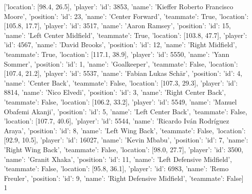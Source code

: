 [{'location': [98.4, 26.5], 'player': {'id': 3853, 'name': 'Kieffer Roberto Francisco Moore'}, 'position': {'id': 23, 'name': 'Center Forward'}, 'teammate': True}, {'location': [105.8, 17.7], 'player': {'id': 3517, 'name': 'Aaron Ramsey'}, 'position': {'id': 15, 'name': 'Left Center Midfield'}, 'teammate': True}, {'location': [103.8, 47.7], 'player': {'id': 4567, 'name': 'David Brooks'}, 'position': {'id': 12, 'name': 'Right Midfield'}, 'teammate': True}, {'location': [117.1, 38.9], 'player': {'id': 5550, 'name': 'Yann Sommer'}, 'position': {'id': 1, 'name': 'Goalkeeper'}, 'teammate': False}, {'location': [107.4, 21.2], 'player': {'id': 5537, 'name': 'Fabian Lukas Schär'}, 'position': {'id': 4, 'name': 'Center Back'}, 'teammate': False}, {'location': [107.3, 29.3], 'player': {'id': 8814, 'name': 'Nico Elvedi'}, 'position': {'id': 3, 'name': 'Right Center Back'}, 'teammate': False}, {'location': [106.2, 33.2], 'player': {'id': 5549, 'name': 'Manuel Obafemi Akanji'}, 'position': {'id': 5, 'name': 'Left Center Back'}, 'teammate': False}, {'location': [107.7, 40.6], 'player': {'id': 5544, 'name': 'Ricardo Iván Rodríguez Araya'}, 'position': {'id': 8, 'name': 'Left Wing Back'}, 'teammate': False}, {'location': [92.9, 10.5], 'player': {'id': 16027, 'name': 'Kevin Mbabu'}, 'position': {'id': 7, 'name': 'Right Wing Back'}, 'teammate': False}, {'location': [98.0, 27.7], 'player': {'id': 3500, 'name': 'Granit Xhaka'}, 'position': {'id': 11, 'name': 'Left Defensive Midfield'}, 'teammate': False}, {'location': [95.8, 36.1], 'player': {'id': 6983, 'name': 'Remo Freuler'}, 'position': {'id': 9, 'name': 'Right Defensive Midfield'}, 'teammate': False}]                                                                                                                                                                                                                                                                                                                                                                                                                                                                                                                                                                                                                                                                                                                                                                                                                                                                                                                                                                                                                                                                                                                                                                                                                                                                                                    1
